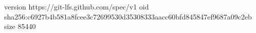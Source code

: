 version https://git-lfs.github.com/spec/v1
oid sha256:c6927b4b581a8fcee3c72699530d35308333aacc60bfd845847ef9687a09c2eb
size 85440
